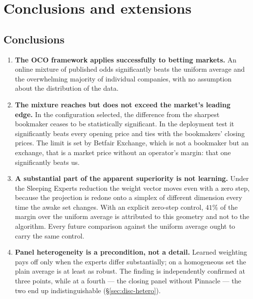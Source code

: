\documentclass[12pt,a4paper,oneside]{report}
\renewcommand{\_}{\oldunderscore\allowbreak}
\theoremstyle{definition}
\theoremstyle{plain}
\theoremstyle{remark}
\begin{document}
\chapter{Conclusions and extensions}
\label{ch:conclusion}

\section{Conclusions}

\begin{enumerate}
  \item \textbf{The OCO framework applies successfully to betting markets.} An online mixture of
        published odds significantly beats the uniform average and the overwhelming majority of
        individual companies, with no assumption about the distribution of the data.

  \item \textbf{The mixture reaches but does not exceed the market's leading edge.} In the
        configuration selected, the difference from the sharpest bookmaker ceases to be
        statistically significant. In the deployment test it significantly beats every opening
        price and ties with the bookmakers' closing prices. The limit is set by Betfair Exchange,
        which is not a bookmaker but an exchange, that is a market price without an operator's
        margin: that one significantly beats us.

  \item \textbf{A substantial part of the apparent superiority is not learning.} Under the
        Sleeping Experts reduction the weight vector moves even with a zero step, because the
        projection is redone onto a simplex of different dimension every time the awake set
        changes. With an explicit zero-step control, $41\%$ of the margin over the uniform average
        is attributed to this geometry and not to the algorithm. Every future comparison against
        the uniform average ought to carry the same control.

  \item \textbf{Panel heterogeneity is a precondition, not a detail.} Learned weighting pays off
        only when the experts differ substantially; on a homogeneous set the plain average is at
        least as robust. The finding is independently confirmed at three points, while at a fourth
        --- the closing panel without Pinnacle --- the two end up indistinguishable
        (\S\ref{sec:disc-hetero}).


\end{enumerate}
\end{document}
